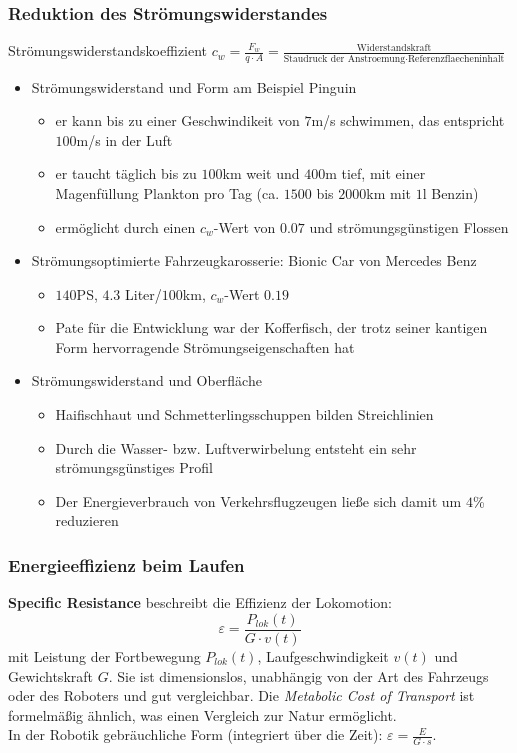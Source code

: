 \subsubsection{Reduktion des Strömungswiderstandes}
Strömungswiderstandskoeffizient $c_w = \frac{F_w}{q \cdot A} = \frac{\text{Widerstandskraft}}{\text{Staudruck der Anstroemung} \cdot \text{Referenzflaecheninhalt}}$
\begin{itemize}
	\item Strömungswiderstand und Form am Beispiel Pinguin
	\begin{itemize}
		\item er kann bis zu einer Geschwindikeit von $7$m/s schwimmen, das entspricht $100$m/s in der Luft
		\item er taucht täglich bis zu $100$km weit und $400$m tief, mit einer Magenfüllung Plankton pro Tag (ca. $1500$ bis $2000$km mit $1$l Benzin)
		\item ermöglicht durch einen $c_w$-Wert von $0.07$ und strömungsgünstigen Flossen
	\end{itemize}
	\item Strömungsoptimierte Fahrzeugkarosserie: Bionic Car von Mercedes Benz
	\begin{itemize}
		\item $140$PS, $4.3$ Liter/$100$km, $c_w$-Wert $0.19$
		\item Pate für die Entwicklung war der Kofferfisch, der trotz seiner kantigen Form hervorragende Strömungseigenschaften hat
	\end{itemize}
	\item Strömungswiderstand und Oberfläche
	\begin{itemize}
		\item Haifischhaut und Schmetterlingsschuppen bilden Streichlinien
		\item Durch die Wasser- bzw. Luftverwirbelung entsteht ein sehr strömungsgünstiges Profil
		\item Der Energieverbrauch von Verkehrsflugzeugen ließe sich damit um $4$\% reduzieren
	\end{itemize}
\end{itemize}

\subsubsection{Energieeffizienz beim Laufen}
\textbf{Specific Resistance} beschreibt die Effizienz der Lokomotion:
\begin{equation}
 \varepsilon = \frac{P_{lok}(t)}{G \cdot v(t)}
\end{equation}
mit Leistung der Fortbewegung $P_{lok}(t)$, Laufgeschwindigkeit $v(t)$ und Gewichtskraft $G$. 
Sie ist dimensionslos, unabhängig von der Art des Fahrzeugs oder des Roboters und gut vergleichbar.
Die \emph{Metabolic Cost of Transport} ist formelmäßig ähnlich, was einen Vergleich zur Natur ermöglicht.\\
\noindent
In der Robotik gebräuchliche Form (integriert über die Zeit): $\varepsilon = \frac{E}{G \cdot s}$.

